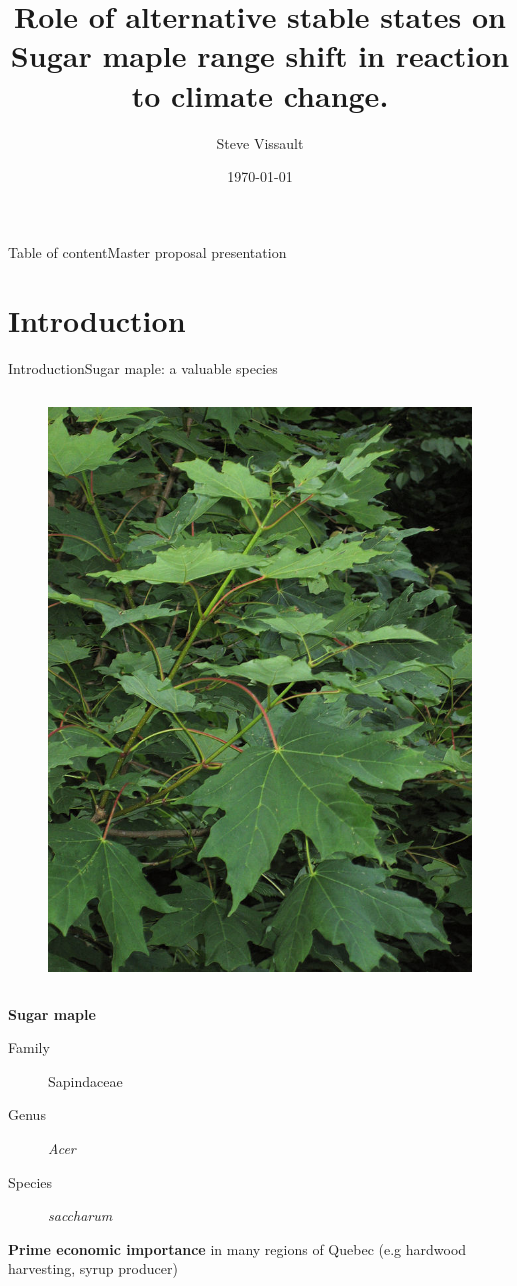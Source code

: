 \documentclass[table]{eecslides}
\title[]{Role of alternative stable states on Sugar maple range shift in reaction to climate change.}
\author[]{\color{white}  Steve Vissault}
\institute[\color{white} UQAR]{\color{white} \textbf{Research proposal \\
Université du Québec à Rimouski}}
\date{ \color{white} \today}
\begin{document}
\begin{frame}[plain]
	\titlepage
\end{frame}

\begin{frame}[plain]{Table of content}{Master proposal presentation}
\tableofcontents
\end{frame}

\section{Introduction}

\begin{frame}{Introduction}{Sugar maple: a valuable species}
	\begin{column}{.3\paperwidth}
		\begin{figure}
			\includegraphics[width=.30\paperwidth]{Figs/Acer.jpg}
			\caption*{}
		\end{figure}
	\end{column}
	\begin{column}{.5\paperwidth}
	\textbf{\alert{Sugar maple}}
		\begin{description}
			\item[Family] Sapindaceae
			\item[Genus] \textit{Acer}
			\item[Species] \textit{saccharum}
		\end{description}
	\pause
	\vspace{1em}
	\textbf{Prime economic importance} in many regions of Quebec
	(e.g hardwood harvesting, syrup producer)
	\end{column}
\end{frame}
\end{document}
